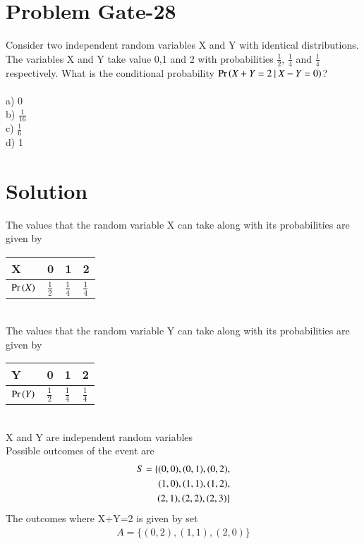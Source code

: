 \documentclass[journal,12pt,twocolumn]{IEEEtran}
\begin{document}
\section*{Problem Gate-28}
Consider two independent random variables X and Y with identical distributions. The variables X and Y take value 0,1 and 2 with probabilities $\frac{1}{2}$, $\frac{1}{4}$ and $\frac{1}{4}$ respectively. What is the conditional probability $\Pr\left(X+Y=2\: |\: X-Y=0\right)$?\\\\
a) 0\\
b) $\frac{1}{16}$\\
c) $\frac{1}{6}$\\
d) 1
\section*{Solution}
The values that the random variable X can take along with its probabilities are given by
\begin{table}[h]
\centering
\begin{tabular}{|l|l|l|l|}
\hline
X             & 0             & 1             & 2             \\ \hline
$\Pr\left(X\right)$ & $\frac{1}{2}$ & $\frac{1}{4}$ & $\frac{1}{4}$ \\ \hline
\end{tabular}
\end{table}
\\
The values that the random variable Y can take along with its probabilities are given by
\begin{table}[h]
\centering
\begin{tabular}{|l|l|l|l|}
\hline
Y             & 0             & 1             & 2             \\ \hline
$\Pr\left(Y\right)$ & $\frac{1}{2}$ & $\frac{1}{4}$ & $\frac{1}{4}$ \\ \hline
\end{tabular}
\end{table}
\\
X and Y are independent random variables\\
Possible outcomes of the event are
\begin{align}
S=\{(0,0),(0,1),(0,2),\notag\\(1,0),(1,1),(1,2),\notag\\(2,1),(2,2),(2,3)\}
\end{align}
The outcomes where X+Y=2 is given by set
\begin{align}
A=\{(0,2),(1,1),(2,0)\}
\end{align}
\end{document}
